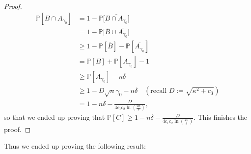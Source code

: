 \documentclass[a4paper,11pt]{amsart}
\newcommand{\IP}{\mathbb{P}}
\theoremstyle{definition}
\theoremstyle{plain}
\theoremstyle{remark}
\begin{document}
\begin{proof}
\begin{equation*}
\begin{split}
\IP[B\cap A_{\gamma_0}]&=1-\IP\Big[\overline{B\cap A_{\gamma_0}}\Big]\\
&=1-\IP\Big[\overline{B}\cup\overline{A_{\gamma_0}}\Big]\\
&\geq1-\IP[\overline{B}]-\IP[\overline{A_{\gamma_0}}]\\
&=\IP[B]+\IP[A_{\gamma_0}]-1\\
&\geq\IP[A_{\gamma_0}]-n\delta\\
&\geq1-D\sqrt{n}\gamma_0-n\delta\quad(\text{recall $D:=\sqrt{\kappa^2+c_3}$})\\
&=1-n\delta-\frac{D}{4c_1c_2\ln(\frac{2n}{\delta})},
\end{split}
\end{equation*}
so that we ended up proving that $\IP[C]\geq1-n\delta-\frac{D}{4c_1c_2\ln(\frac{2n}{\delta})}$. This finishes the proof.
\end{proof}

Thus we ended up proving the following result:
\end{document}
